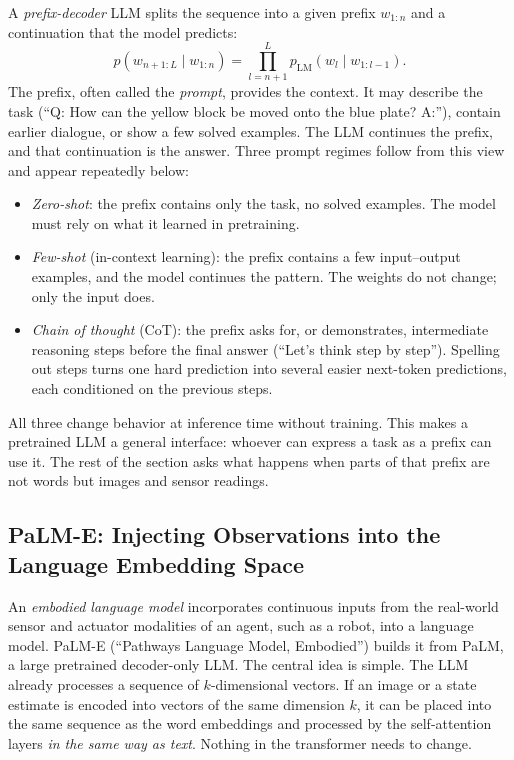 A \emph{prefix-decoder} LLM splits the sequence into a given prefix
$w_{1:n}$ and a continuation that the model predicts:
\begin{equation}
  p(w_{n+1:L}\mid w_{1:n})
    = \prod_{l=n+1}^{L} p_{\mathrm{LM}}(w_l \mid w_{1:l-1}) .
  \label{eq:mllm-prefix}
\end{equation}
\noindent
The prefix, often called the \emph{prompt}, provides the context. It may
describe the task (``Q: How can the yellow block be moved onto the blue plate?
A:''), contain earlier dialogue, or show a few solved examples. The LLM
continues the prefix, and that continuation is the answer. Three prompt
regimes follow from this view and appear repeatedly below:
\begin{itemize}
  \item \emph{Zero-shot}: the prefix contains only the task, no solved
    examples. The model must rely on what it learned in pretraining.
  \item \emph{Few-shot} (in-context learning): the prefix contains a few
    input--output examples, and the model continues the pattern. The weights
    do not change; only the input does.
  \item \emph{Chain of thought} (CoT): the prefix asks for, or demonstrates,
    intermediate reasoning steps before the final answer (``Let's think step
    by step''). Spelling out steps turns one hard prediction into several
    easier next-token predictions, each conditioned on the previous steps.
\end{itemize}

\noindent
All three change behavior at inference time without training. This makes a
pretrained LLM a general interface: whoever can express a task as a prefix
can use it. The rest of the section asks what happens when parts of that
prefix are not words but images and sensor readings.

\subsection{PaLM-E: Injecting Observations into the Language Embedding Space}

An \emph{embodied language model} incorporates continuous inputs from the
real-world sensor and actuator modalities of an agent, such as a robot, into
a language model. PaLM-E (``Pathways Language Model, Embodied'') builds it
from PaLM, a large pretrained decoder-only LLM. The central idea is simple.
The LLM already processes a sequence of $k$-dimensional vectors. If an image
or a state estimate is encoded into vectors of the same dimension $k$, it can
be placed into the same sequence as the word embeddings and processed by the
self-attention layers \emph{in the same way as text}. Nothing in the
transformer needs to change.

